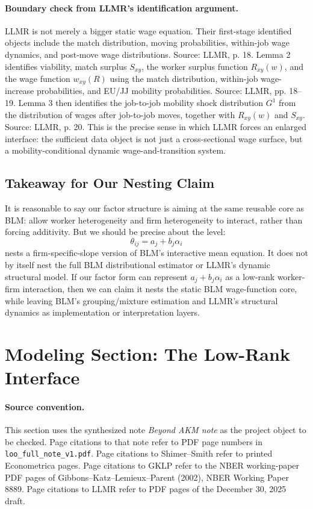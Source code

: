 \documentclass[11pt]{article}
\begin{document}
\paragraph{Boundary check from LLMR's identification argument.}
LLMR is not merely a bigger static wage equation. Their first-stage identified objects
include the match distribution, moving probabilities, within-job wage dynamics, and
post-move wage distributions. Source: LLMR, p. 18. Lemma 2 identifies viability,
match surplus $S_{xy}$, the worker surplus function $R_{xy}(w)$, and the wage function
$w_{xy}(R)$ using the match distribution, within-job wage-increase probabilities, and
EU/JJ mobility probabilities. Source: LLMR, pp. 18--19. Lemma 3 then identifies the
job-to-job mobility shock distribution $G^1$ from the distribution of wages after
job-to-job moves, together with $R_{xy}(w)$ and $S_{xy}$. Source: LLMR, p. 20. This
is the precise sense in which LLMR forces an enlarged interface: the sufficient data
object is not just a cross-sectional wage surface, but a mobility-conditional dynamic
wage-and-transition system.

\subsection{Takeaway for Our Nesting Claim}

It is reasonable to say our factor structure is aiming at the same reusable core as
BLM: allow worker heterogeneity and firm heterogeneity to interact, rather than
forcing additivity. But we should be precise about the level:
\[
\theta_{ij}=a_j+b_j\alpha_i
\]
nests a firm-specific-slope version of BLM's interactive mean equation. It does not by
itself nest the full BLM distributional estimator or LLMR's dynamic structural model.
If our factor form can represent $a_j+b_j\alpha_i$ as a low-rank worker-firm
interaction, then we can claim it nests the static BLM wage-function core, while
leaving BLM's grouping/mixture estimation and LLMR's structural dynamics as
implementation or interpretation layers.

\section{Modeling Section: The Low-Rank Interface}

\paragraph{Source convention.}
This section uses the synthesized note \emph{Beyond AKM note} as the project object
to be checked. Page citations to that note refer to PDF page numbers in
\texttt{loo\_full\_note\_v1.pdf}. Page citations to Shimer--Smith refer to printed
Econometrica pages. Page citations to GKLP refer to the NBER working-paper PDF
pages of Gibbons--Katz--Lemieux--Parent (2002), NBER Working Paper 8889. Page
citations to LLMR refer to PDF pages of the December 30, 2025 draft.
\end{document}
